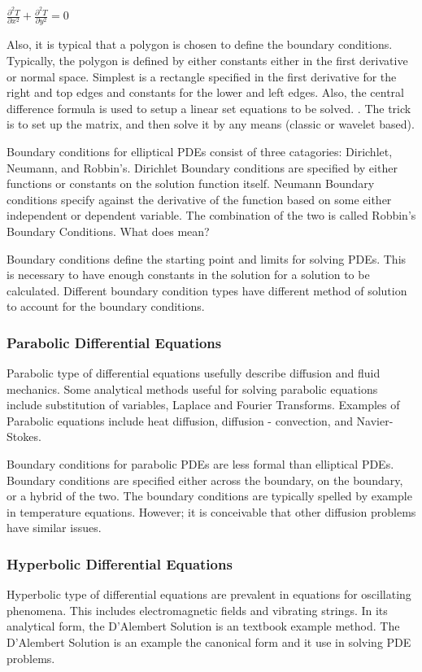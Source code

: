 \documentclass[11pt]{article}
\begin{document}
$\frac{\partial ^2 T} {\partial x^2} + \frac{\partial ^2 T} {\partial y^2} = 0$  

Also, it is typical that a polygon is chosen to define the boundary conditions.   Typically, the polygon is defined by either constants either in the first derivative or normal space.  %
Simplest is a rectangle specified in the first derivative for the right and top edges and constants for the lower and left edges.  Also, the central difference formula is used to setup a linear set equations to be solved.  \cite{appliedmethods}.  The trick is to set up the matrix, and then solve it by any means (classic or wavelet based).  

Boundary conditions for elliptical PDEs consist of three catagories: Dirichlet, Neumann, and Robbin's.  Dirichlet Boundary conditions are specified by either functions or constants on the solution function itself.  Neumann Boundary conditions specify against the derivative of the function based on some either independent or dependent variable.  The combination of the two is called Robbin's Boundary Conditions.  What does mean?

Boundary conditions define the starting point and limits for solving PDEs.  This is necessary to have enough constants in the solution for a solution to be calculated.  Different boundary condition types have different method of solution to account for the boundary conditions.  

\subsubsection {Parabolic Differential Equations}
Parabolic type of differential equations usefully describe diffusion and fluid mechanics.  Some analytical methods useful for solving parabolic equations include substitution of variables, Laplace and Fourier Transforms.  Examples of Parabolic equations include heat diffusion, diffusion - convection, and Navier-Stokes.  

Boundary conditions for parabolic PDEs are less formal than elliptical PDEs.  Boundary conditions are specified either across the boundary, on the boundary, or a hybrid of the two.    The boundary conditions are typically spelled by example in temperature equations.  However; it is conceivable that other diffusion problems have similar issues.  

\subsubsection {Hyperbolic Differential Equations}
Hyperbolic type of differential equations are prevalent in equations for oscillating phenomena.  This includes electromagnetic fields and vibrating strings.   In its analytical form, the D'Alembert Solution is an textbook example method.  The D'Alembert Solution is an example the canonical form and it use in solving PDE problems.  
\end{document}
